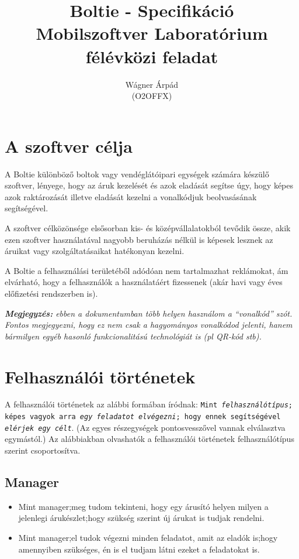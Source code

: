 \documentclass[12pt,a4paper]{article}
\title{Boltie - Specifikáció \\[1ex] \large Mobilszoftver Laboratórium félévközi feladat}
\author{Wágner Árpád\\(O2OFFX)}
\begin{document}
	
	\maketitle
	\vfill
	\tableofcontents
	\vfill
	\newpage
	
	\section{A szoftver célja}
	A Boltie különböző boltok vagy vendéglátóipari egységek számára készülő szoftver, lényege, hogy az áruk kezelését és azok eladását segítse úgy, hogy képes azok raktározását illetve eladását kezelni a vonalkódjuk beolvasásának segítségével.
	
	A szoftver célközönsége elsősorban kis- és középvállalatokból tevődik össze, akik ezen szoftver használatával nagyobb beruházás nélkül is képesek lesznek az áruikat vagy szolgáltatásaikat hatékonyan kezelni.
	
	A Boltie a felhasználási területéből adódóan nem tartalmazhat reklámokat, ám elvárható, hogy a felhasználók a használatáért fizessenek (akár havi vagy éves előfizetési rendszerben is).
	
	\textit{\textbf{Megjegyzés:} ebben a dokumentumban több helyen használom a ``vonalkód'' szót. Fontos megjegyezni, hogy ez nem csak a hagyományos vonalkódod jelenti, hanem bármilyen egyéb hasonló funkcionalitású technológiát is (pl QR-kód stb).}
	
	\section{Felhasználói történetek}
	A felhasználói történetek az alábbi formában íródnak: \texttt{Mint \textit{felhasználótípus}; képes vagyok arra \textit{egy feladatot elvégezni}; hogy ennek segítségével \textit{elérjek egy célt}}. (Az egyes részegységek pontosvesszővel vannak elválasztva egymástól.)\newline
	Az alábbiakban olvashatók a felhasználói történetek felhasználótípus szerint csoportosítva.
	\subsection{Manager}
	\begin{itemize}
		\item Mint manager;\newline meg tudom tekinteni, hogy egy árusító helyen milyen a jelenlegi árukészlet;\newline hogy szükség szerint új árukat is tudjak rendelni.
		\item Mint manager;\newline el tudok végezni minden feladatot, amit az eladók is;\newline  hogy amennyiben szükséges, én is el tudjam látni ezeket a feladatokat is.
	\end{itemize}
	
\end{document}
